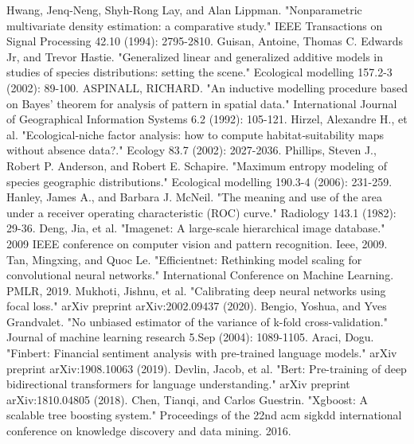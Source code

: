 \documentclass[12pt]{article}
\begin{document}
\begin{thebibliography}{99}
	Hwang, Jenq-Neng, Shyh-Rong Lay, and Alan Lippman. "Nonparametric multivariate density estimation: a comparative study." IEEE Transactions on Signal Processing 42.10 (1994): 2795-2810.
	Guisan, Antoine, Thomas C. Edwards Jr, and Trevor Hastie. "Generalized linear and generalized additive models in studies of species distributions: setting the scene." Ecological modelling 157.2-3 (2002): 89-100.
	 ASPINALL, RICHARD. "An inductive modelling procedure based on Bayes' theorem for analysis of pattern in spatial data." International Journal of Geographical Information Systems 6.2 (1992): 105-121.
	Hirzel, Alexandre H., et al. "Ecological‐niche factor analysis: how to compute habitat‐suitability maps without absence data?." Ecology 83.7 (2002): 2027-2036.
	Phillips, Steven J., Robert P. Anderson, and Robert E. Schapire. "Maximum entropy modeling of species geographic distributions." Ecological modelling 190.3-4 (2006): 231-259.
	Hanley, James A., and Barbara J. McNeil. "The meaning and use of the area under a receiver operating characteristic (ROC) curve." Radiology 143.1 (1982): 29-36.
	Deng, Jia, et al. "Imagenet: A large-scale hierarchical image database." 2009 IEEE conference on computer vision and pattern recognition. Ieee, 2009.
	Tan, Mingxing, and Quoc Le. "Efficientnet: Rethinking model scaling for convolutional neural networks." International Conference on Machine Learning. PMLR, 2019.
	Mukhoti, Jishnu, et al. "Calibrating deep neural networks using focal loss." arXiv preprint arXiv:2002.09437 (2020).
	Bengio, Yoshua, and Yves Grandvalet. "No unbiased estimator of the variance of k-fold cross-validation." Journal of machine learning research 5.Sep (2004): 1089-1105.
	Araci, Dogu. "Finbert: Financial sentiment analysis with pre-trained language models." arXiv preprint arXiv:1908.10063 (2019).
	Devlin, Jacob, et al. "Bert: Pre-training of deep bidirectional transformers for language understanding." arXiv preprint arXiv:1810.04805 (2018).
	Chen, Tianqi, and Carlos Guestrin. "Xgboost: A scalable tree boosting system." Proceedings of the 22nd acm sigkdd international conference on knowledge discovery and data mining. 2016.
\end{thebibliography}
\end{document}
